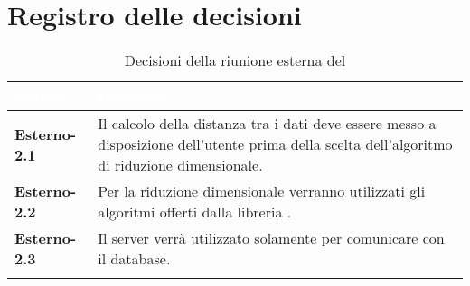 \section{Registro delle decisioni}
{
\renewcommand{\arraystretch}{1.5}
\centering
\begin{longtable}{C{3cm} C{9cm}}
\textcolor{white}{\textbf{Codice}}&
\textcolor{white}{\textbf{Decisione}}\\	
\endhead
		
\textbf{Esterno-2.1} & Il calcolo della distanza tra i dati deve essere messo a disposizione dell'utente prima della scelta dell'algoritmo di riduzione dimensionale.\\

\textbf{Esterno-2.2} & Per la riduzione dimensionale verranno utilizzati gli algoritmi offerti dalla libreria .\\

\textbf{Esterno-2.3} & Il server verrà utilizzato solamente per comunicare con il database.\\

\caption{Decisioni della riunione esterna del \Data{}}
		
\end{longtable}
}



